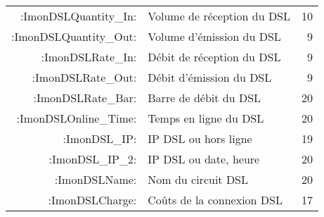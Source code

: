 \begin{description}
\begin{small}
\begin{center}
\begin{longtable}{rp{7cm}r}
   :ImonDSLQuantity\_In: &       Volume de réception du DSL &  10 \\
  :ImonDSLQuantity\_Out: &       Volume d'émission du DSL   &   9 \\
       :ImonDSLRate\_In: &       Débit de réception du DSL  &   9 \\
      :ImonDSLRate\_Out: &       Débit d'émission du DSL    &   9 \\
      :ImonDSLRate\_Bar: &       Barre de débit du DSL      &  20 \\
   :ImonDSLOnline\_Time: &       Temps en ligne du DSL      &  20 \\
           :ImonDSL\_IP: &       IP DSL ou hors ligne       &  19 \\
        :ImonDSL\_IP\_2: &       IP DSL ou date, heure      &  20 \\
           :ImonDSLName: &       Nom du circuit DSL         &  20 \\
         :ImonDSLCharge: &       Coûts de la connexion DSL  &  17 \\
         

\end{longtable}
\end{center}
\end{small}
\end{description}
